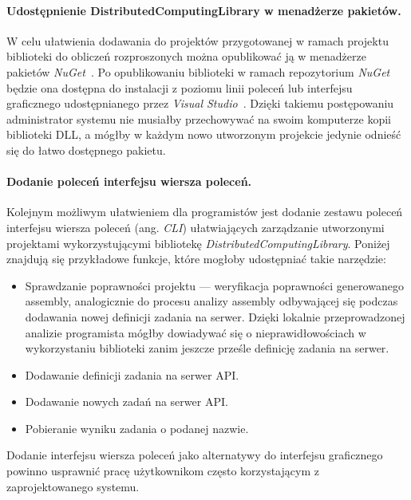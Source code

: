 \documentclass[a4paper,11pt,twoside]{report}
\theoremstyle{definition}
\begin{document}
        \paragraph{Udostępnienie DistributedComputingLibrary w menadżerze pakietów.}
        W celu ułatwienia dodawania do projektów przygotowanej w ramach projektu biblioteki do obliczeń rozproszonych można opublikować ją w menadżerze pakietów \textit{NuGet}~\cite{nuget}. Po opublikowaniu biblioteki w ramach repozytorium \textit{NuGet} będzie ona dostępna do instalacji z poziomu linii poleceń lub interfejsu graficznego udostępnianego przez \textit{Visual Studio}~\cite{visual-studio}. Dzięki takiemu postępowaniu administrator systemu nie musiałby przechowywać na swoim komputerze kopii biblioteki DLL, a mógłby w każdym nowo utworzonym projekcie jedynie odnieść się do łatwo dostępnego pakietu.
        
        \paragraph{Dodanie poleceń interfejsu wiersza poleceń.}
        Kolejnym możliwym ułatwieniem dla programistów jest dodanie zestawu poleceń interfejsu wiersza poleceń (ang. \textit{CLI}) ułatwiających zarządzanie utworzonymi projektami wykorzystującymi bibliotekę \textit{DistributedComputingLibrary}. Poniżej znajdują się przykładowe funkcje, które mogłoby udostępniać takie narzędzie:
        
        \begin{itemize}
            \item Sprawdzanie poprawności projektu --- weryfikacja poprawności generowanego assembly, analogicznie do procesu analizy assembly odbywającej się podczas dodawania nowej definicji zadania na serwer. Dzięki lokalnie przeprowadzonej analizie programista mógłby dowiadywać się o nieprawidłowościach w wykorzystaniu biblioteki zanim jeszcze prześle definicję zadania na serwer.
            \item Dodawanie definicji zadania na serwer API.
            \item Dodawanie nowych zadań na serwer API.
            \item Pobieranie wyniku zadania o podanej nazwie.
        \end{itemize}
        
        Dodanie interfejsu wiersza poleceń jako alternatywy do interfejsu graficznego powinno usprawnić pracę użytkownikom często korzystającym z zaprojektowanego systemu.
        
\end{document}
